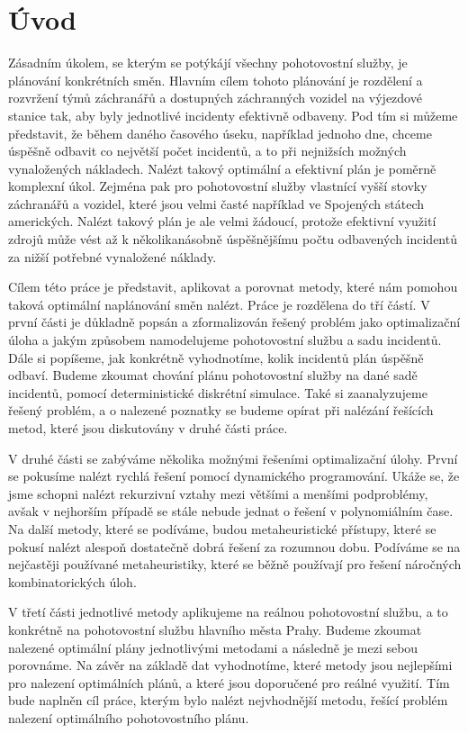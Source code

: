 \chapter*{Úvod}

Zásadním úkolem, se kterým se potýkájí všechny pohotovostní služby, je plánování konkrétních směn.
Hlavním cílem tohoto plánování je rozdělení a rozvržení týmů záchranářů a dostupných záchranných vozidel na výjezdové stanice tak, aby byly jednotlivé incidenty efektivně odbaveny. 
Pod tím si můžeme představit, že během daného časového úseku, například jednoho dne, chceme úspěšně odbavit co největší počet incidentů, a to při nejnižsích možných vynaložených nákladech.
Nalézt takový optimální a efektivní plán je poměrně komplexní úkol. Zejména pak pro pohotovostní služby
vlastnící vyšší stovky záchranářů a vozidel, které jsou velmi časté například ve Spojených státech amerických. 
Nalézt takový plán je ale velmi žádoucí, protože efektivní využití zdrojů může vést až k několikanásobně úspěšnějšímu
počtu odbavených incidentů za nižší potřebné vynaložené náklady.

Cílem této práce je představit, aplikovat a porovnat metody, které nám pomohou taková optimální naplánování směn nalézt. 
Práce je rozdělena do tří částí.
V první části je důkladně popsán a zformalizován řešený problém jako optimalizační úloha a jakým způsobem namodelujeme pohotovostní službu a sadu incidentů.
Dále si popíšeme, jak konkrétně vyhodnotíme, kolik incidentů plán úspěšně odbaví.
Budeme zkoumat chování plánu pohotovostní služby na dané sadě incidentů, pomocí deterministické diskrétní simulace.
Také si zaanalyzujeme řešený problém, a o nalezené poznatky se budeme opírat při nalézání řešících metod, které jsou diskutovány v druhé části práce.

V druhé části se zabýváme několika možnými řešeními optimalizační úlohy.
První se pokusíme nalézt rychlá řešení pomocí dynamického programování.
Ukáže se, že jsme schopni nalézt rekurzivní vztahy mezi většími a menšími podproblémy, avšak v nejhorším případě se stále nebude jednat o řešení v polynomiálním čase.
Na další metody, které se podíváme, budou metaheuristické přístupy, které se pokusí nalézt alespoň dostatečně dobrá řešení za rozumnou dobu.
Podíváme se na nejčastěji používané metaheuristiky, které se běžně používají pro řešení náročných kombinatorických úloh.

V třetí části jednotlivé metody aplikujeme na reálnou pohotovostní službu, a to konkrétně na pohotovostní službu hlavního města Prahy.
Budeme zkoumat nalezené optimální plány jednotlivými metodami a následně je mezi sebou porovnáme.
Na závěr na základě dat vyhodnotíme, které metody jsou nejlepšími pro nalezení optimálních plánů, a které jsou doporučené pro reálné využití.
Tím bude naplněn cíl práce, kterým bylo nalézt nejvhodnější metodu, řešící problém nalezení optimálního pohotovostního plánu. 

